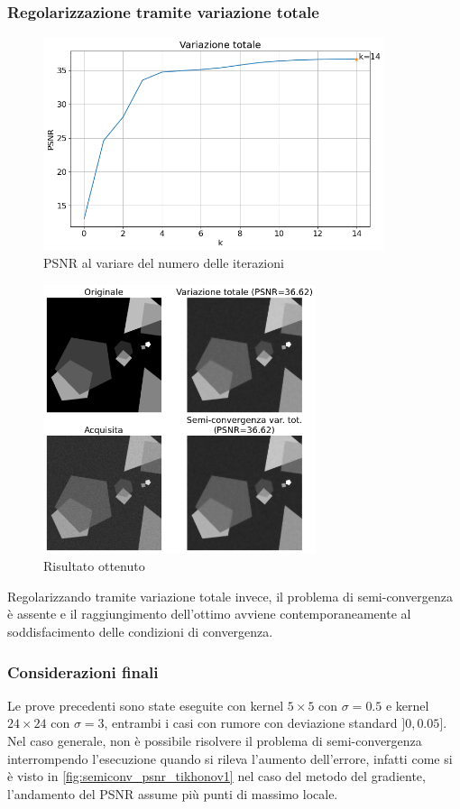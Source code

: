 \documentclass[11pt]{article}
\begin{document}
\subsubsection{Regolarizzazione tramite variazione totale}
\begin{figure}[H]
    \centering
    \includegraphics[width=10cm]{semiconvergenza/1/psnr_tv.png}
    \caption{PSNR al variare del numero delle iterazioni}
    \label{fig:semiconv_psnr_tv1}
\end{figure}
\begin{figure}[H]
    \centering
    \includegraphics[width=8cm]{semiconvergenza/1/deblur_tv.png}
    \caption{Risultato ottenuto}
    \label{fig:semiconv_deblur_tv1}
\end{figure}
Regolarizzando tramite variazione totale invece, il problema di semi-convergenza è assente e il raggiungimento dell'ottimo avviene contemporaneamente al soddisfacimento delle condizioni di convergenza.

\subsubsection{Considerazioni finali}
Le prove precedenti sono state eseguite con kernel $5 \times 5$ con $\sigma=0.5$ e kernel $24 \times 24$ con $\sigma=3$, entrambi i casi con rumore con deviazione standard $]0, 0.05]$.\\
Nel caso generale, non è possibile risolvere il problema di semi-convergenza interrompendo l'esecuzione quando si rileva l'aumento dell'errore, 
infatti come si è visto in \autoref{fig:semiconv_psnr_tikhonov1} nel caso del metodo del gradiente, l'andamento del PSNR assume più punti di massimo locale.
\end{document}
